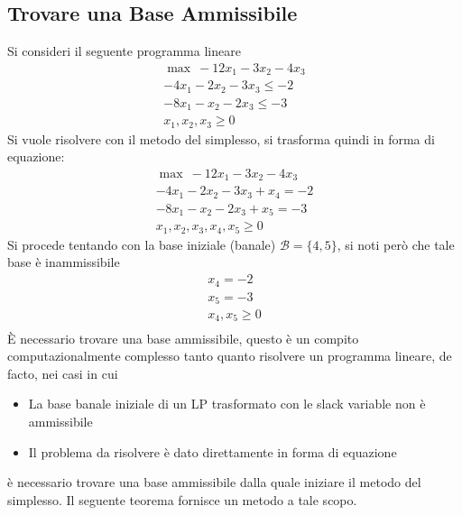 \documentclass[10pt, letterpaper]{report}
\begin{document}
\subsection{Trovare una Base Ammissibile}
Si consideri il seguente programma lineare 
\begin{eqnarray*}
    \max \ -12x_1-3x_2-4x_3\\ 
    -4x_1-2x_2-3x_3\le -2 \\ 
    -8x_1-x_2-2x_3\le -3\\ 
    x_1,x_2,x_3\ge 0 
\end{eqnarray*}
Si vuole risolvere con il metodo del simplesso, si trasforma quindi in forma di equazione:\begin{equation}\label{trivial_basis_inf}\begin{matrix}
    \max \ -12x_1-3x_2-4x_3\\ 
    -4x_1-2x_2-3x_3+x_4= -2 \\ 
    -8x_1-x_2-2x_3+x_5= -3\\ 
    x_1,x_2,x_3,x_4,x_5\ge 0 \end{matrix}
\end{equation}
Si procede tentando con la base iniziale (banale) $\mathcal B = \{4,5\}$, si noti però che tale base è inammissibile
\begin{eqnarray*}
    x_4= -2 \\ 
    x_5= -3\\ 
    x_4,x_5\ge 0 \\ 
\end{eqnarray*}
È necessario trovare una base ammissibile, questo è un compito computazionalmente complesso tanto quanto risolvere un programma lineare, de facto, nei casi in cui\begin{itemize}
    \item La base banale iniziale di un LP trasformato con le slack variable non è ammissibile
    \item Il problema da risolvere è dato direttamente in forma di equazione 
\end{itemize}
è necessario trovare una base ammissibile dalla quale iniziare il metodo del simplesso. Il seguente teorema fornisce un metodo a tale scopo.
\end{document}
